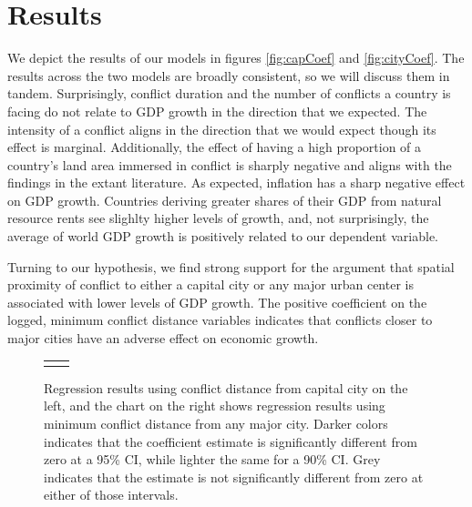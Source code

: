 \section{Results}
\label{findings} 

We depict the results of our models in figures \ref{fig:capCoef} and \ref{fig:cityCoef}. The results across the two models are broadly consistent, so we will discuss them in tandem. Surprisingly, conflict duration and the number of conflicts a country is facing do not relate to GDP growth in the direction that we expected. The intensity of a conflict aligns in the direction that we would expect though its effect is marginal. Additionally, the effect of having a high proportion of a country's land area immersed in conflict is sharply negative and aligns with the findings in the extant literature. As expected, inflation has a sharp negative effect on GDP growth. Countries deriving greater shares of their GDP from natural resource rents see slighlty higher levels of growth, and, not surprisingly, the average of world GDP growth is positively related to our dependent variable.


Turning to our hypothesis, we find strong support for the argument that spatial proximity of conflict to either a capital city or any major urban center is associated with lower levels of GDP growth. The positive coefficient on the logged, minimum conflict distance variables indicates that conflicts closer to major cities have an adverse effect on economic growth. 

\begin{figure}
	\centering
	\begin{tabular}{cc}
		\subfloat[SubFigure 1][Capital City]{
			\resizebox{.45\textwidth}{!}{}
		\label{fig:capCoef}} &
		\subfloat[SubFigure 2][Any Major City]{
			\resizebox{.45\textwidth}{!}{}
		\label{fig:cityCoef}}
	\end{tabular}
	\caption{Regression results using conflict distance from capital city on the left, and the chart on the right shows regression results using minimum conflict distance from any major city. Darker colors indicates that the coefficient estimate is significantly different from zero at a 95\% CI, while lighter the same for a 90\% CI. Grey indicates that the estimate is not significantly different from zero at either of those intervals.}
	\label{fig:coefplot}
\end{figure}

